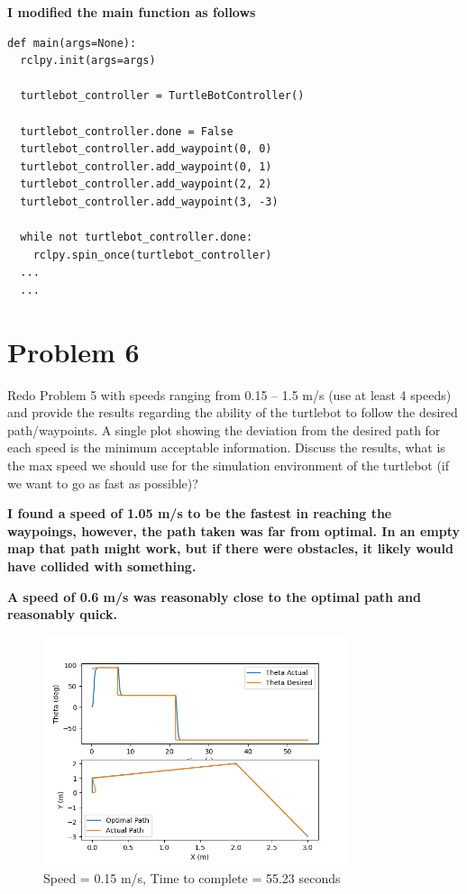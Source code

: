 \documentclass{article}
\begin{document}
\noindent \textbf{I modified the main function as follows}

\begin{verbatim}
def main(args=None):
  rclpy.init(args=args)

  turtlebot_controller = TurtleBotController()

  turtlebot_controller.done = False
  turtlebot_controller.add_waypoint(0, 0)
  turtlebot_controller.add_waypoint(0, 1)
  turtlebot_controller.add_waypoint(2, 2)
  turtlebot_controller.add_waypoint(3, -3)

  while not turtlebot_controller.done:
    rclpy.spin_once(turtlebot_controller)
  ...
  ...
\end{verbatim}

\section*{Problem 6}

Redo Problem 5 with speeds ranging from 0.15 – 1.5 m/s (use at least 4 speeds) and provide the
results regarding the ability of the turtlebot to follow the desired path/waypoints. A single plot
showing the deviation from the desired path for each speed is the minimum acceptable information.
Discuss the results, what is the max speed we should use for the simulation environment of the
turtlebot (if we want to go as fast as possible)?


\bigskip
\textbf{I found a speed of 1.05 m/s to be the fastest in reaching the waypoings, however, the path taken was far from optimal.
In an empty map that path might work, but if there were obstacles, it likely would have collided with something.}

\bigskip
\textbf{A speed of 0.6 m/s was reasonably close to the optimal path and reasonably quick.}


\begin{figure}[h]
  \centering
  \includegraphics[width=0.8\textwidth]{question6-0.15ms.png}
  \caption*{Speed = 0.15 m/s, Time to complete = 55.23 seconds }  
\end{figure}
\end{document}
